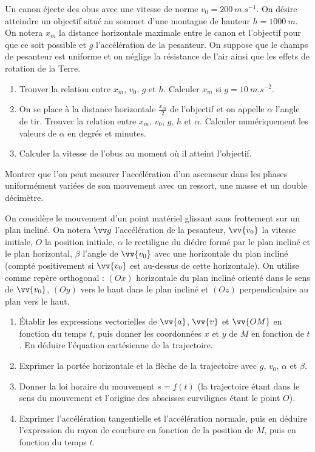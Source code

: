 \begin{exercice}
  Un canon éjecte des obus avec une vitesse de norme $v_0=\SI{200}{m.s^{-1}}$. On désire atteindre un objectif situé au sommet d'une montagne de hauteur $h=\SI{1000}{m}$. On notera $x_m$ la distance horizontale maximale entre le canon et l'objectif pour que ce soit possible et $g$ l'accélération de la pesanteur. On suppose que le champs de pesanteur est uniforme et on néglige la résistance de l'air ainsi que les effets de rotation de la Terre.
  \begin{enumerate}
  \item Trouver la relation entre $x_m$, $v_0$, $g$ et $h$. Calculer $x_m$ si $g=\SI{10}{m.s^{-2}}$.
  \item On se place à la distance horizontale $\frac{x_m}{2}$ de l'objectif et on appelle $\alpha$ l'angle de tir. Trouver la relation entre $x_m$, $v_0$, $g$, $h$ et $\alpha$. Calculer numériquement les valeurs de $\alpha$ en degrés et minutes.
  \item Calculer la vitesse de l'obus au moment où il atteint l'objectif.
  \end{enumerate}
\end{exercice}
%
\begin{exercice}[Accéléromètre]
  Montrer que l'on peut mesurer l'accélération d'un ascenseur dans les phases uniformément variées de son mouvement avec un ressort, une masse et un double décimètre.
\end{exercice}
%
\begin{exercice}
  On considère le mouvement d'un point matériel glissant sans frottement sur un plan incliné. On notera $\vg$ l'accélération de la pesanteur, $\vv{v_0}$ la vitesse initiale, $O$ la position initiale, $\alpha$ le rectiligne du diédre formé par le plan incliné et le plan horizontal, $\beta$ l'angle de $\vv{v_0}$ avec une horizontale du plan incliné (compté positivement si $\vv{v_0}$ est au-dessus de cette horizontale). On utilise comme repère orthogonal : $(Ox)$ horizontale du plan incliné orienté dans le sens de $\vv{v_0}$, $(Oy)$ vers le haut dans le plan incliné et $(Oz)$ perpendiculaire au plan vers le haut.
  \begin{enumerate}
  \item Établir les expressions vectorielles de $\vv{a}$, $\vv{v}$ et $\vv{OM}$ en fonction du temps $t$, puis donner les coordonnées $x$ et $y$ de $M$ en fonction de $t$. En déduire l'équation cartésienne de la trajectoire.
  \item Exprimer la portée horizontale et la flèche de la trajectoire avec $g$, $v_0$, $\alpha$ et $\beta$.
  \item Donner la loi horaire du mouvement $s=f(t)$ (la trajectoire étant dans le sens du mouvement et l'origine des abscisses curvilignes étant le point $O$).
  \item Exprimer l'accélération tangentielle et l'accélération normale, puis en déduire l'expression du rayon de courbure en fonction de la position de $M$, puis en fonction du temps $t$.   
  \end{enumerate}
\end{exercice}
